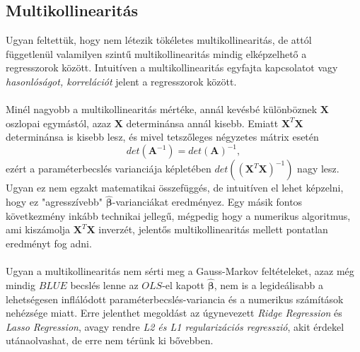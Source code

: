 \documentclass[14p]{report}
\def\pmb{\boldsymbol}
\def\ebeta{\hat{\pmb{\beta}}}
\begin{document}
	\subsection{Multikollinearitás}
	Ugyan feltettük, hogy nem létezik tökéletes multikollinearitás, de attól függetlenül valamilyen szintű multikollinearitás mindig elképzelhető a regresszorok között. Intuitíven a multikollinearitás egyfajta kapcsolatot vagy \emph{hasonlóságot, korrelációt} jelent a regresszorok között.
	\\
	\\
	Minél nagyobb a multikollinearitás mértéke, annál kevésbé különböznek $\pmb{X}$ oszlopai egymástól, azaz $\pmb{X}$ determinánsa annál kisebb. Emiatt $\pmb{X}^T\pmb{X}$ determinánsa is kisebb lesz, és mivel tetszőleges négyzetes mátrix esetén
	\[
		det(\pmb{A}^{-1}) = det(\pmb{A})^{-1},
	\]
	ezért a paraméterbecslés varianciája képletében $det((\pmb{X}^T\pmb{X})^{-1})$ nagy lesz. Ugyan ez nem egzakt matematikai összefüggés, de intuitíven el lehet képzelni, hogy ez "agresszívebb" $\ebeta$-varianciákat eredményez. Egy másik fontos következmény inkább technikai jellegű, mégpedig hogy a numerikus algoritmus, ami kiszámolja $\pmb{X}^T\pmb{X}$ inverzét, jelentős multikollinearitás mellett pontatlan eredményt fog adni. 
	\\
	\\
	Ugyan a multikollinearitás nem sérti meg a Gauss-Markov feltételeket, azaz még mindig $BLUE$ becslés lenne az $OLS$-el kapott $\ebeta$, nem is a legideálisabb a lehetségesen inflálódott paraméterbecslés-variancia és a numerikus számítások nehézsége miatt. Erre jelenthet megoldást az úgynevezett \emph{Ridge Regression} és \emph{Lasso Regression}, avagy rendre \emph{L2 és L1 regularizációs regresszió}, akit érdekel utánaolvashat, de erre nem térünk ki bővebben.
	
\end{document}
